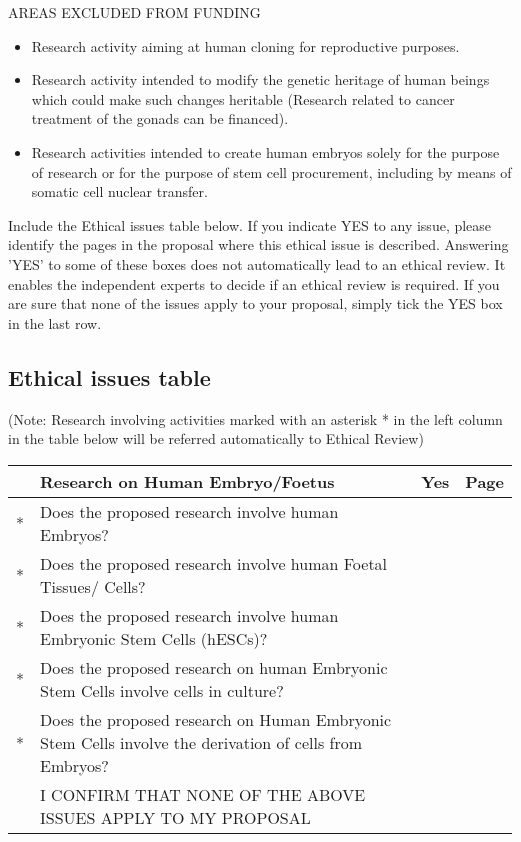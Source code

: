 \documentclass[a4paper,11pt]{article}
\begin{document}
AREAS EXCLUDED FROM FUNDING
\begin{itemize}
\item Research activity aiming at human cloning for reproductive
  purposes.
\item Research activity intended to modify the genetic heritage of
  human beings which could make such changes heritable (Research
  related to cancer treatment of the gonads can be financed).
\item Research activities intended to create human embryos solely for
  the purpose of research or for the purpose of stem cell procurement,
  including by means of somatic cell nuclear transfer.
\end{itemize}

Include the Ethical issues table below. If you indicate YES to any
issue, please identify the pages in the proposal where this ethical
issue is described. Answering 'YES' to some of these boxes does not
automatically lead to an ethical review. It enables the independent
experts to decide if an ethical review is required. If you are sure
that none of the issues apply to your proposal, simply tick the YES
box in the last row.

\clearpage

\subsection{Ethical issues table}

(Note: Research involving activities marked with an asterisk * in the
left column in the table below will be referred automatically to
Ethical Review)

\renewcommand{\tabularxcolumn}[1]{>{\arraybackslash}m{#1}}

\vspace{0.5cm}
\begin{tabularx}{\linewidth}{ | c | X | c | c | }
\rowcolor{black} & {\centering\arraybackslash \color{white} \bf Research on Human Embryo/Foetus} & {\color{white} \bf Yes} & {\color{white} \bf Page} \\ \hline
 * & Does the proposed research involve human Embryos?                                                      & & \\ \hline
 * & Does the proposed research involve human Foetal Tissues/ Cells?                                        & & \\ \hline
 * & Does the proposed research involve human Embryonic Stem Cells (hESCs)?                                 & & \\ \hline
 * & Does the proposed research on human Embryonic Stem Cells involve cells in culture?                     & & \\ \hline
 * & Does the proposed research on Human Embryonic Stem Cells involve the derivation of cells from Embryos? & & \\ \hline
   & I CONFIRM THAT NONE OF THE ABOVE ISSUES APPLY TO MY PROPOSAL                                           & & \cellcolor[gray]{0.8}\\ \hline 
\end{tabularx}
\end{document}
